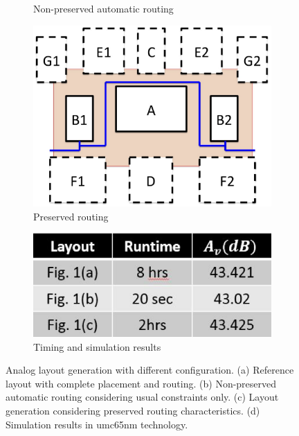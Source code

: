 \begin{figure}
\begin{subfigure}[t]{0.4\textwidth}
        \caption{Non-preserved automatic routing}
        \label{fig:RoutingPreserv_B}
        \end{subfigure}
        \begin{subfigure}[t]{0.4\textwidth}
        \includegraphics[width=\textwidth]{Fig/Introduction/RoutingPreserv_c.eps}
        \caption{Preserved routing}
        \label{fig:RoutingPreserv_C}
        \end{subfigure}
        \begin{subfigure}[t]{0.4\textwidth}
        \includegraphics[width=\textwidth]{Fig/Introduction/RoutingPreserv_d.eps}
        \caption{Timing and simulation results}
        \label{fig:RoutingPreserv_d}
        \end{subfigure}
        \caption{Analog layout generation with different configuration. (a) Reference layout with complete placement and routing. (b) Non-preserved automatic routing considering usual constraints only. (c) Layout generation considering preserved routing characteristics. (d) Simulation results in umc65nm technology.}
        \label{fig:RoutingPreserv}
      \end{figure}

